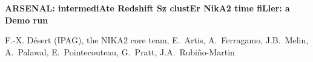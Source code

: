 \documentclass[10pt,a4paper,twoside,graphicx,color]{article}
\begin{document}
%
%
\begin{center}{\huge \bf
ARSENAL: intermediAte Redshift Sz clustEr NikA2 time fiLler: a Demo run
}\end{center}
% 
\begin{center}
  F.-X. D\'esert (IPAG), the NIKA2 core team, E.~Artis,
  A.~Ferragamo, J.B.~Melin, A.~Palawal,
  E.~Pointecouteau, G.~Pratt, J.A.~Rubiño-Martin
%   
% 

\end{center}
\end{document}

